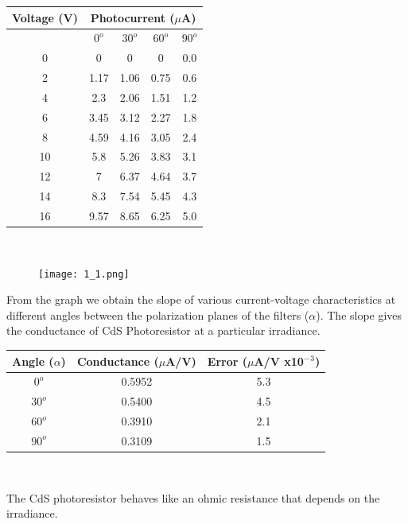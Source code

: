 \documentclass[12pt]{report}
\begin{document}
\begin{center}
	\begin{tabular}{ |c|c|c|c|c| } 
		\hline
		Voltage (V) & \multicolumn{4}{|c|}{Photocurrent ($\mu$A)}\\ 
		\hline
		& $0^o$ & $30^o$ & $60^o$ & $90^o$ \\
		\hline
		0  & 0    & 0    & 0    & 0.0 \\
		2  & 1.17 & 1.06 & 0.75 & 0.6 \\
		4  & 2.3  & 2.06 & 1.51 & 1.2 \\
		6  & 3.45 & 3.12 & 2.27 & 1.8 \\
		8  & 4.59 & 4.16 & 3.05 & 2.4 \\
		10 & 5.8  & 5.26 & 3.83 & 3.1 \\
		12 & 7    & 6.37 & 4.64 & 3.7 \\
		14 & 8.3  & 7.54 & 5.45 & 4.3 \\
		16 & 9.57 & 8.65 & 6.25 & 5.0 \\
		\hline
	\end{tabular}
	\\
\end{center}

\begin{figure}[h!]
	\centering
	\texttt{[image: 1\_1.png]}
\end{figure}

\vspace{0.5cm}

From the graph we obtain the slope of various current-voltage characteristics at different angles between the polarization planes of the filters ($\alpha$). The slope gives the conductance of CdS Photoresistor at a particular irradiance. \\

\begin{center}
	\begin{tabular}{ |c|c|c| } 
		\hline
		Angle ($\alpha$) &  Conductance ($\mu$A/V) & Error ($\mu$A/V x10$^-$$^3$) \\ 
		\hline
		$0^o$   & 0.5952 & 5.3\\
		$30^o$  & 0.5400 & 4.5\\
		$60^o$  & 0.3910 & 2.1\\
		$90^o$  & 0.3109 & 1.5\\
		\hline
	\end{tabular}
	\\
\end{center}

The CdS photoresistor behaves like an ohmic resistance that depends on the irradiance.\\
\end{document}
